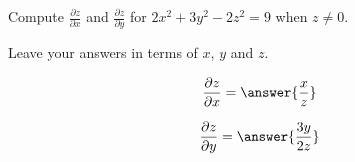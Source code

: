\documentclass{ximera}
\author{David Guichard \and Neal Koblitz \and H. Jerome Keisler \and Albert Scheller \and Barry Balof \and Mike Wills \and Matthew Carr}
\begin{document}
\begin{exercise}




Compute $\frac{\partial z}{\partial x}$ and $\frac{\partial z}{\partial y}$ for $2x^2+3y^2-2z^2=9$ when $z\ne 0$.

Leave your answers in terms of $x$, $y$ and $z$.
\begin{prompt}
\[
\frac{\partial z}{\partial x}=\answer{\frac{x}{z}}
\]
\end{prompt}

\begin{prompt}
\[
\frac{\partial z}{\partial y}=\answer{\frac{3y}{2z}}
\]
\end{prompt}

\end{exercise}
\end{document}
